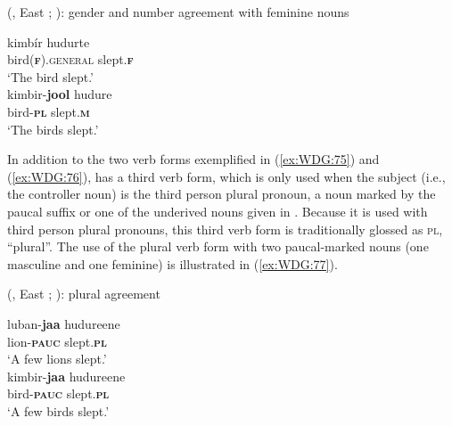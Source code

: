 \documentclass[output=collectionpaper]{langsci/langscibook}
\begin{document}
%

\ea\label{ex:WDG:76}
 (, East ; \citealt[182]{Corbett2000}): gender and number agreement with feminine nouns\\
\begin{xlist}
\ex
\gll 	kimbír 	hudurte \\
	bird(\textbf{\textsc{f}}).\textsc{general} 	slept.\textbf{\textsc{f}} \\
\glt	`The bird slept.' \\
\ex
\gll 	kimbir-\textbf{jool} 	hudure \\
	bird-\textbf{\textsc{pl}} 	slept.\textbf{\textsc{m}} \\
\glt	`The birds slept.' \\
\end{xlist}
\z

In addition to the two verb forms exemplified in (\ref{ex:WDG:75}) and (\ref{ex:WDG:76}),  has a third verb form, which is only used when the subject (i.e., the controller noun) is the third person plural pronoun, a noun marked by the paucal suffix or one of the underived nouns given in . Because it is used with third person plural pronouns, this third verb form is traditionally glossed as \textsc{pl}, ``plural''. The use of the plural verb form with two paucal-marked nouns (one masculine and one feminine) is illustrated in (\ref{ex:WDG:77}).

\ea\label{ex:WDG:77}
 (, East ; \citealt[181--182]{Corbett2000}): plural agreement\\
\begin{xlist}
\ex
\gll 	luban-\textbf{jaa} 	hudureene\\
lion-\textbf{\textsc{pauc}} 	slept.\textbf{\textsc{pl}} \\
\glt		`A few lions slept.' \\
\ex
\gll 	kimbir-\textbf{jaa} 	hudureene\\
bird-\textbf{\textsc{pauc}} 	slept.\textbf{\textsc{pl}} \\
\glt		`A few birds slept.' \\
\end{xlist}
\z
\end{document}
